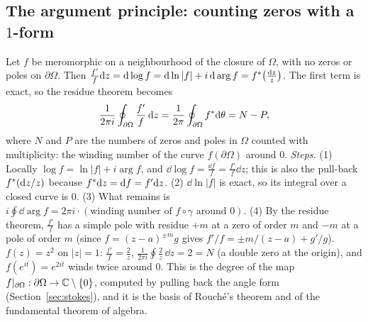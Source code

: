 \subsection{The argument principle: counting zeros with a $1$-form}\label{sec:argument}

Let $f$ be meromorphic on a neighbourhood of the closure of $\Omega$, with no zeros or poles on $\partial\Omega$. Then $\frac{f'}f\mathrm{d} z=\mathrm{d}\log f=\mathrm{d}\ln|f|+i\,\mathrm{d}\arg f=f{}^{*}\bigl(\frac{\mathrm{d} z}z\bigr)$. The first term is exact, so the residue theorem becomes
\begin{equation}\label{eq:argument}
\frac1{2\pi i}\oint_{\partial\Omega}\frac{f'}f\,\mathrm{d} z=\frac1{2\pi}\oint_{\partial\Omega}f{}^{*}\mathrm{d}\theta=N-P,
\end{equation}
where $N$ and $P$ are the numbers of zeros and poles in $\Omega$ counted with multiplicity: the winding number of the curve $f(\partial\Omega)$ around $0$.
\emph{Steps.} (1) Locally $\log f=\ln|f|+i\arg f$, and $\dd\log f=\frac{\dd f}f=\frac{f'}f\dd z$; this is also the pull-back $f{}^{*}(\mathrm{d} z/z)$ because $f{}^{*}\mathrm{d} z=\mathrm{d} f=f'\mathrm{d} z$. (2) $\dd\ln|f|$ is exact, so its integral over a closed curve is $0$. (3) What remains is $i\oint\dd\arg f=2\pi i\cdot(\text{winding number of }f\circ\gamma\text{ around }0)$.
(4) By the residue theorem, $\frac{f'}f$ has a simple pole with residue $+m$ at a zero of order $m$ and $-m$ at a pole of order $m$ (since $f=(z-a)^{\pm m}g$ gives $f'/f=\pm m/(z-a)+g'/g$).
\numcheck $f(z)=z^2$ on $|z|=1$: $\frac{f'}f=\frac2z$, $\frac1{2\pi i}\oint\frac2z\,\dd z=2=N$ (a double zero at the origin), and $f(e^{it})=e^{2it}$ winds twice around $0$.
This is the degree of the map $f|_{\partial\Omega}:\partial\Omega\to\mathbb{C}\setminus\{0\}$, computed by pulling back the angle form (Section~\ref{sec:stokes}), and it is the basis of Rouch\'e's theorem and of the fundamental theorem of algebra.

